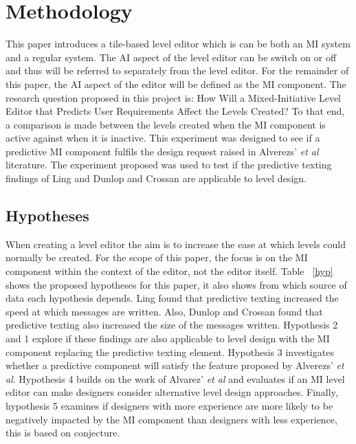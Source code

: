 \documentclass[journal]{IEEEtran}
\begin{document}
\section{Methodology}
This paper introduces a tile-based level editor which is can be both an MI system and a regular system. The AI aspect of the level editor can be switch on or off and thus will be referred to separately from the level editor. For the remainder of this paper, the AI aspect of the editor will be defined as the MI component.  The research question proposed in this project is: How Will a Mixed-Initiative Level Editor that Predicts User Requirements Affect the Levels Created? To that end, a comparison is made between the levels created when the MI component is active against when it is inactive. This experiment was designed to see if a predictive MI component fulfils the design request raised in Alverezs' \textit{et al}\cite{alvarez2018fostering} literature. The experiment proposed was used to test if the predictive texting findings of Ling \cite{ling2005length} and Dunlop and Crossan\cite{dunlop2000predictive} are applicable to level design.  

\subsection{Hypotheses}\label{Hypotheses}
When creating a level editor the aim is to increase the ease at which levels could normally be created. For the scope of this paper, the focus is on the MI component within the context of the editor, not the editor itself. Table ~\ref{hyp} shows the proposed hypotheses for this paper, it also shows from which source of data each hypothesis depends. Ling \cite{ling2005length} found that predictive texting increased the speed at which messages are written. Also, Dunlop and Crossan\cite{dunlop2000predictive} found that predictive texting also increased the size of the messages written. Hypothesis 2 and 1 explore if these findings are also applicable to level design with the MI component replacing the predictive texting element. Hypothesis 3 investigates whether a predictive component will satisfy the feature proposed by Alverezs' \textit{et al}\cite{alvarez2018fostering}. Hypothesis 4 builds on the work of Alvarez' \textit{et al}\cite{alvarez2018fostering} and evaluates if an MI level editor can make designers consider alternative level design approaches. Finally, hypothesis 5 examines if designers with more experience are more likely to be negatively impacted by the MI component than designers with less experience, this is based on conjecture.
\end{document}
